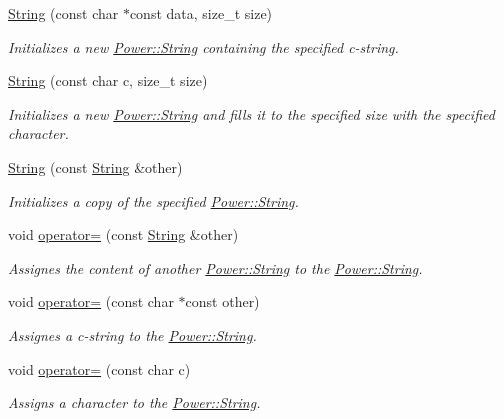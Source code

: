 \begin{DoxyCompactItemize}
\hyperlink{class_power_1_1_string_a5cdd1615dce9d4a72dc5ca1e75763fc3}{String} (const char $\ast$const data, size\+\_\+t size)
\begin{DoxyCompactList}\small\item\em Initializes a new \hyperlink{class_power_1_1_string}{Power\+::\+String} containing the specified c-\/string. \end{DoxyCompactList}\item 
\hyperlink{class_power_1_1_string_ac7d68eb85c5d8d5f2d7b8e24bd83aa5b}{String} (const char c, size\+\_\+t size)
\begin{DoxyCompactList}\small\item\em Initializes a new \hyperlink{class_power_1_1_string}{Power\+::\+String} and fills it to the specified size with the specified character. \end{DoxyCompactList}\item 
\hyperlink{class_power_1_1_string_adfe9fa7f75d91211013f408396615d32}{String} (const \hyperlink{class_power_1_1_string}{String} \&other)
\begin{DoxyCompactList}\small\item\em Initializes a copy of the specified \hyperlink{class_power_1_1_string}{Power\+::\+String}. \end{DoxyCompactList}\item 
void \hyperlink{class_power_1_1_string_ac0ec7adf5e627919b560ce591add0644}{operator=} (const \hyperlink{class_power_1_1_string}{String} \&other)
\begin{DoxyCompactList}\small\item\em Assignes the content of another \hyperlink{class_power_1_1_string}{Power\+::\+String} to the \hyperlink{class_power_1_1_string}{Power\+::\+String}. \end{DoxyCompactList}\item 
void \hyperlink{class_power_1_1_string_abf5f2db360bf2c1853bccfcc8e2d3225}{operator=} (const char $\ast$const other)
\begin{DoxyCompactList}\small\item\em Assignes a c-\/string to the \hyperlink{class_power_1_1_string}{Power\+::\+String}. \end{DoxyCompactList}\item 
void \hyperlink{class_power_1_1_string_afca363999008481eb546192d24f8c9c1}{operator=} (const char c)
\begin{DoxyCompactList}\small\item\em Assigns a character to the \hyperlink{class_power_1_1_string}{Power\+::\+String}. \end{DoxyCompactList}\item 

\end{DoxyCompactItemize}
